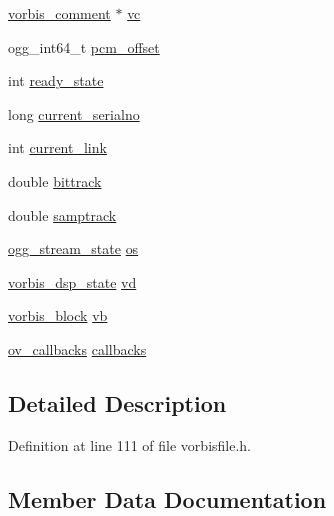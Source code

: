 \begin{DoxyCompactItemize}
\mbox{\hyperlink{structvorbis__comment}{vorbis\+\_\+comment}} $\ast$ \mbox{\hyperlink{struct_ogg_vorbis___file_a4467850c72aed93fe0a70e8f1fd6f20e}{vc}}
\item 
ogg\+\_\+int64\+\_\+t \mbox{\hyperlink{struct_ogg_vorbis___file_a23d5ba7ca52640ceb6f633a46304cdc5}{pcm\+\_\+offset}}
\item 
int \mbox{\hyperlink{struct_ogg_vorbis___file_ad304fe18bebc075c34f2e5ec7d1f2a99}{ready\+\_\+state}}
\item 
long \mbox{\hyperlink{struct_ogg_vorbis___file_ad7545f86b92a6d66641f3d04a2497763}{current\+\_\+serialno}}
\item 
int \mbox{\hyperlink{struct_ogg_vorbis___file_a9b2d64c3739364ac4c08070aac2e0588}{current\+\_\+link}}
\item 
double \mbox{\hyperlink{struct_ogg_vorbis___file_aa72a11d9f154636d4dc9edac4c9eb843}{bittrack}}
\item 
double \mbox{\hyperlink{struct_ogg_vorbis___file_a3fcbfeaad027ada99496dfcaf94866a9}{samptrack}}
\item 
\mbox{\hyperlink{structogg__stream__state}{ogg\+\_\+stream\+\_\+state}} \mbox{\hyperlink{struct_ogg_vorbis___file_a8658f17a6f662a74f8763c47d560d712}{os}}
\item 
\mbox{\hyperlink{structvorbis__dsp__state}{vorbis\+\_\+dsp\+\_\+state}} \mbox{\hyperlink{struct_ogg_vorbis___file_acb9d38719f54642d1a39f24203b466d6}{vd}}
\item 
\mbox{\hyperlink{structvorbis__block}{vorbis\+\_\+block}} \mbox{\hyperlink{struct_ogg_vorbis___file_a3201599977a781b7bf559167cd892638}{vb}}
\item 
\mbox{\hyperlink{structov__callbacks}{ov\+\_\+callbacks}} \mbox{\hyperlink{struct_ogg_vorbis___file_afb1474e24193f577dd21395a76199415}{callbacks}}
\end{DoxyCompactItemize}


\subsection{Detailed Description}


Definition at line 111 of file vorbisfile.\+h.



\subsection{Member Data Documentation}
\mbox{\label{struct_ogg_vorbis___file_aa72a11d9f154636d4dc9edac4c9eb843}} 
